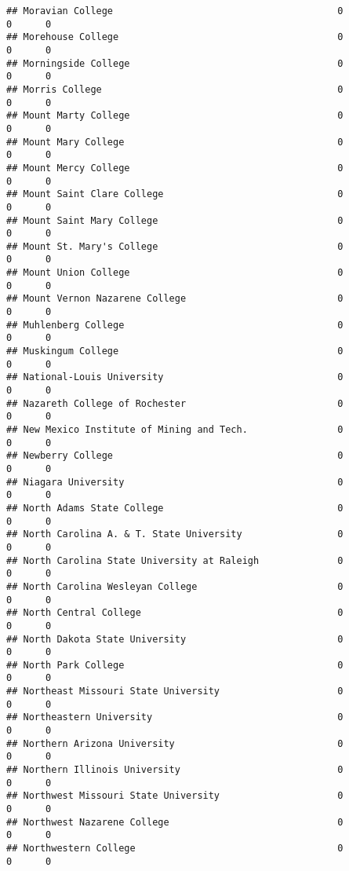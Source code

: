 \documentclass[
]{article}
\begin{document}
\begin{verbatim}
## Moravian College                                        0          0      0
## Morehouse College                                       0          0      0
## Morningside College                                     0          0      0
## Morris College                                          0          0      0
## Mount Marty College                                     0          0      0
## Mount Mary College                                      0          0      0
## Mount Mercy College                                     0          0      0
## Mount Saint Clare College                               0          0      0
## Mount Saint Mary College                                0          0      0
## Mount St. Mary's College                                0          0      0
## Mount Union College                                     0          0      0
## Mount Vernon Nazarene College                           0          0      0
## Muhlenberg College                                      0          0      0
## Muskingum College                                       0          0      0
## National-Louis University                               0          0      0
## Nazareth College of Rochester                           0          0      0
## New Mexico Institute of Mining and Tech.                0          0      0
## Newberry College                                        0          0      0
## Niagara University                                      0          0      0
## North Adams State College                               0          0      0
## North Carolina A. & T. State University                 0          0      0
## North Carolina State University at Raleigh              0          0      0
## North Carolina Wesleyan College                         0          0      0
## North Central College                                   0          0      0
## North Dakota State University                           0          0      0
## North Park College                                      0          0      0
## Northeast Missouri State University                     0          0      0
## Northeastern University                                 0          0      0
## Northern Arizona University                             0          0      0
## Northern Illinois University                            0          0      0
## Northwest Missouri State University                     0          0      0
## Northwest Nazarene College                              0          0      0
## Northwestern College                                    0          0      0

\end{verbatim}
\end{document}
